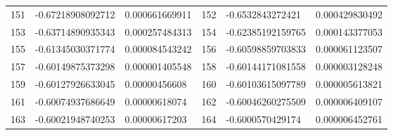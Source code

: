 \documentclass{amsart}
\numberwithin{equation}{section}
\numberwithin{table}{section}
\begin{document}
\begin{longtable}{@{}rll@{\hspace{2.2em}}rll@{}}
151 & -0.67218908092712 & 0.000661669911 & 152 & -0.6532843272421 & 0.000429830492 \\
153 & -0.63714890935343 & 0.000257484313 & 154 & -0.62385192159765 & 0.000143377053 \\
155 & -0.61345030371774 & 0.000084543242 & 156 & -0.60598859703833 & 0.000061123507 \\
157 & -0.60149875373298 & 0.000001405548 & 158 & -0.60144171081558 & 0.000003128248 \\
159 & -0.60127926633045 & 0.00000456608 & 160 & -0.60103615097789 & 0.000005613821 \\
161 & -0.60074937686649 & 0.00000618074 & 162 & -0.60046260275509 & 0.000006409107 \\
163 & -0.60021948740253 & 0.00000617203 & 164 & -0.6000570429174 & 0.000006452761 \\
\hline
\end{longtable}
\endgroup
\begingroup\small
\setlength{\tabcolsep}{10pt}\renewcommand{\arraystretch}{1.15}
\end{document}
